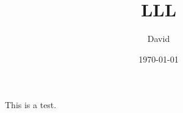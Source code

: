 \documentclass[12pt]{report}
\title{LLL}
\author{David}
\date{\today}
\begin{document}
    \maketitle
    This is a test.
\end{document}

